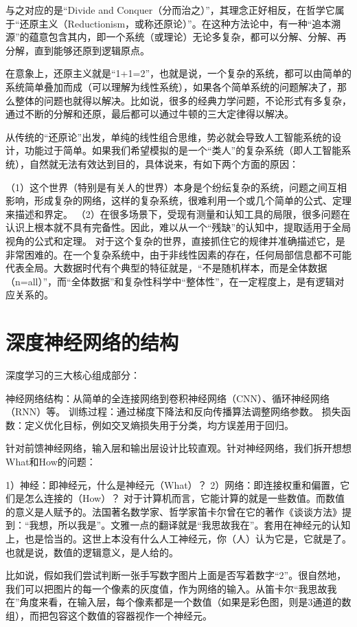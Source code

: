 {与之对应的是“Divide and Conquer（分而治之）”，其理念正好相反，在哲学它属于“还原主义（Reductionism，或称还原论）”。在这种方法论中，有一种“追本溯源”的蕴意包含其内，即一个系统（或理论）无论多复杂，都可以分解、分解、再分解，直到能够还原到逻辑原点。

在意象上，还原主义就是“1+1=2”，也就是说，一个复杂的系统，都可以由简单的系统简单叠加而成（可以理解为线性系统），如果各个简单系统的问题解决了，那么整体的问题也就得以解决。比如说，很多的经典力学问题，不论形式有多复杂，通过不断的分解和还原，最后都可以通过牛顿的三大定律得以解决。

从传统的“还原论”出发，单纯的线性组合思维，势必就会导致人工智能系统的设计，功能过于简单。如果我们希望模拟的是一个“类人”的复杂系统（即人工智能系统），自然就无法有效达到目的，具体说来，有如下两个方面的原因：

（1）这个世界（特别是有关人的世界）本身是个纷纭复杂的系统，问题之间互相影响，形成复杂的网络，这样的复杂系统，很难利用一个或几个简单的公式、定理来描述和界定。
（2）在很多场景下，受现有测量和认知工具的局限，很多问题在认识上根本就不具有完备性。因此，难以从一个“残缺”的认知中，提取适用于全局视角的公式和定理。
对于这个复杂的世界，直接抓住它的规律并准确描述它，是非常困难的。在一个复杂系统中，由于非线性因素的存在，任何局部信息都不可能代表全局。大数据时代有个典型的特征就是，“不是随机样本，而是全体数据（n=all）”，而“全体数据”和复杂性科学中“整体性”，在一定程度上，是有逻辑对应关系的。

\section{深度神经网络的结构}

深度学习的三大核心组成部分：

神经网络结构：从简单的全连接网络到卷积神经网络（CNN）、循环神经网络（RNN）等。
训练过程：通过梯度下降法和反向传播算法调整网络参数。
损失函数：定义优化目标，例如交叉熵损失用于分类，均方误差用于回归。


针对前馈神经网络，输入层和输出层设计比较直观。针对神经网络，我们拆开想想What和How的问题：

1）神经：即神经元，什么是神经元（What）？
2）网络：即连接权重和偏置，它们是怎么连接的（How）？
对于计算机而言，它能计算的就是一些数值。而数值的意义是人赋予的。法国著名数学家、哲学家笛卡尔曾在它的著作《谈谈方法》提到：“我想，所以我是”。文雅一点的翻译就是“我思故我在”。套用在神经元的认知上，也是恰当的。这世上本没有什么人工神经元，你（人）认为它是，它就是了。也就是说，数值的逻辑意义，是人给的。

比如说，假如我们尝试判断一张手写数字图片上面是否写着数字“2”。很自然地，我们可以把图片的每一个像素的灰度值，作为网络的输入。从笛卡尔“我思故我在”角度来看，在输入层，每个像素都是一个数值（如果是彩色图，则是3通道的数组），而把包容这个数值的容器视作一个神经元。

}
